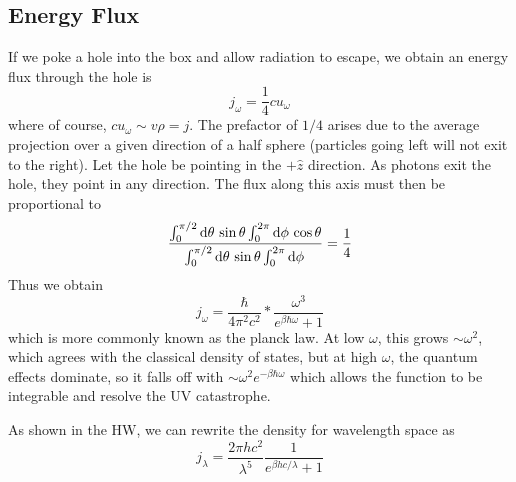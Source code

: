 \subsection{Energy Flux}
If we poke a hole into the box and allow radiation to escape, we obtain an energy flux through the hole is
\[j_\omega = \frac{1}{4}c u_\omega\]
where of course, \(c u_\omega\sim v\rho = j\). The prefactor of \(1/4\) arises due to the average projection over a given direction of a half sphere (particles going left will not exit to the right). Let the hole be pointing in the \(+\hat z\) direction. As photons exit the hole, they point in any direction. The flux along this axis must then be proportional to 
\[\frac{\int_0^{\pi/2}\d\theta\sin\theta\int_0^{2\pi}\d\phi\cos\theta }{\int_0^{\pi/2} \d\theta\sin\theta\int_0^{2\pi}\d\phi}= \frac{1}{4}\]
Thus we obtain 
\begin{equation}
	j_\omega = \frac{\hbar}{4\pi^2c^2}*\frac{\omega^3}{e^{\beta\hbar\omega}+1}
\end{equation}
which is more commonly known as the planck law. At low \(\omega\), this grows \(\sim \omega^2\), which agrees with the classical density of states, but at high \(\omega\), the quantum effects dominate, so
it falls off with \(\sim\omega^2e^{-\beta\hbar\omega}\) which allows the function to be integrable and resolve the UV catastrophe.


As shown in the HW, we can rewrite the density for wavelength space as
\begin{equation}
	j_\lambda = \frac{2\pi hc^2}{\lambda^5}\frac{1}{e^{\beta hc/\lambda}+1}
\end{equation}

